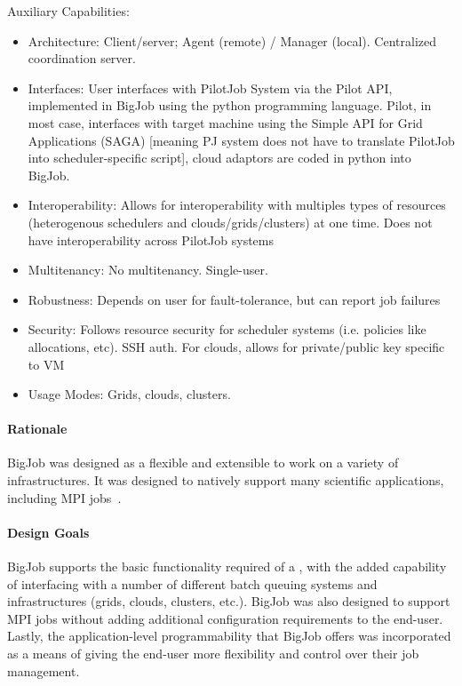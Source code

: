 \documentclass{sig-alternate}
\begin{document}
Auxiliary Capabilities:
\begin{itemize}
\item Architecture: Client/server; Agent (remote) / Manager (local). Centralized coordination server.

\item Interfaces: User interfaces with PilotJob System via the Pilot API, implemented in BigJob using the python programming language. Pilot, in most case, interfaces with target machine using the Simple API for Grid Applications (SAGA) [meaning PJ system does not have to translate PilotJob into scheduler-specific script], cloud adaptors are coded in python into BigJob.

\item Interoperability: Allows for interoperability with multiples types of resources (heterogenous schedulers and clouds/grids/clusters) at one time. Does not have interoperability across PilotJob systems

\item Multitenancy: No multitenancy. Single-user.

\item Robustness: Depends on user for fault-tolerance, but can report job failures

\item Security: Follows resource security for scheduler systems (i.e. policies like allocations, etc). SSH auth. For clouds, allows for private/public key specific to VM

\item Usage Modes: Grids, clouds, clusters.
\end{itemize}

\paragraph{Rationale}
BigJob was designed as a flexible and extensible \pilotjob
to work on a variety of infrastructures. It was designed to
natively support many scientific applications, including
MPI jobs~\cite{saga_bigjob_condor_cloud}.

\paragraph{Design Goals}
BigJob supports the basic functionality required of a \pilotjob,
with the added capability of interfacing with a number of
different batch queuing systems and infrastructures (grids,
clouds, clusters, etc.). BigJob was also designed to
support MPI jobs without adding additional configuration
requirements to the end-user. Lastly, the application-level
programmability that BigJob offers was incorporated as a
means of giving the end-user more flexibility and control
over their job management.
\end{document}
